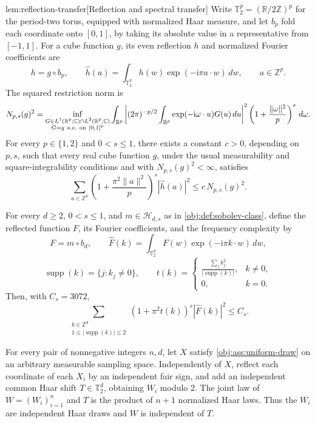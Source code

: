 \begin{lemmav}{lem:reflection-transfer}[Reflection and spectral transfer]
Write \(\mathbb T_2^p=(\mathbb R/2\mathbb Z)^p\) for the period-two torus, equipped with normalized Haar measure, and let \(b_p\) fold each coordinate onto \([0,1]\), by taking its absolute value in a representative from \([-1,1]\). For a cube function \(g\), its even reflection \(h\) and normalized Fourier coefficients are
\[
h=g\circ b_p,\qquad
\widehat h(a)=\int_{\mathbb T_2^p}h(w)
  \exp(-\mathrm i\pi a\cdot w)\,dw,
\qquad a\in\mathbb Z^p.
\]
The squared restriction norm is
\[
N_{p,s}(g)^2
=
\inf_{\substack{G\in L^1(\mathbb R^p;\mathbb C)\cap L^2(\mathbb R^p;\mathbb C)\\
G=g\ {\rm a.e.}\ {\rm on}\ [0,1]^p}}
\int_{\mathbb R^p}
\left|
(2\pi)^{-p/2}
\int_{\mathbb R^p}\exp(-\mathrm i\omega\cdot u)G(u)\,du
\right|^2
\left(1+\frac{\|\omega\|^2}{p}\right)^s\,d\omega.
\]
For every \(p\in\{1,2\}\) and \(0<s\leq1\), there exists a constant \(c>0\), depending on \(p,s\), such that every real cube function \(g\), under the usual measurability and square-integrability conditions and with \(N_{p,s}(g)^2<\infty\), satisfies
\[
\sum_{a\in\mathbb Z^p}
\left(1+\frac{\pi^2\|a\|^2}{p}\right)^s
|\widehat h(a)|^2
\leq c\,N_{p,s}(g)^2.
\]

For every \(d\geq2\), \(0<s\leq1\), and \(m\in\mathcal H_{d,s}\) as in \cref{obj:def:sobolev-class}, define the reflected function \(F\), its Fourier coefficients, and the frequency complexity by
\[
F=m\circ b_d,\qquad
\widehat F(k)=\int_{\mathbb T_2^d}F(w)
  \exp(-\mathrm i\pi k\cdot w)\,dw,
\]
\[
\operatorname{supp}(k)=\{j:k_j\neq0\},\qquad
t(k)=
\begin{cases}
\displaystyle\frac{\sum_j k_j^2}{|\operatorname{supp}(k)|},&k\neq0,\\
0,&k=0.
\end{cases}
\]
Then, with \(C_s=3072\),
\[
\sum_{\substack{k\in\mathbb Z^d\\
1\leq|\operatorname{supp}(k)|\leq2}}
(1+\pi^2t(k))^s|\widehat F(k)|^2
\leq C_s.
\]

For every pair of nonnegative integers \(n,d\), let \(X\) satisfy \cref{obj:ass:uniform-draw} on an arbitrary measurable sampling space. Independently of \(X\), reflect each coordinate of each \(X_i\) by an independent fair sign, and add an independent common Haar shift \(T\in\mathbb T_2^d\), obtaining \(W_i\) modulo \(2\). The joint law of \(W=(W_i)_{i=1}^n\) and \(T\) is the product of \(n+1\) normalized Haar laws. Thus the \(W_i\) are independent Haar draws and \(W\) is independent of \(T\).


\end{lemmav}

